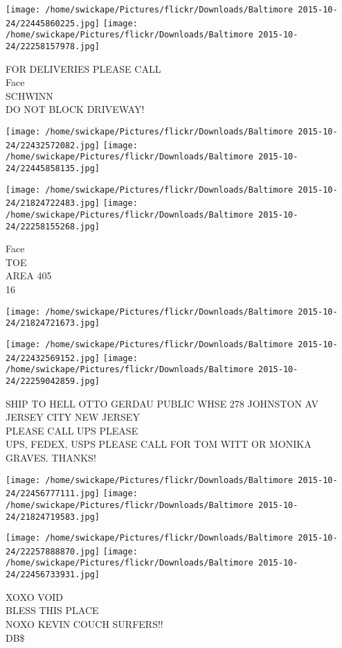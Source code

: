 \documentclass[10pt,letterpaper]{article}
\begin{document}
\texttt{[image: /home/swickape/Pictures/flickr/Downloads/Baltimore 2015-10-24/22445860225.jpg]}
\texttt{[image: /home/swickape/Pictures/flickr/Downloads/Baltimore 2015-10-24/22258157978.jpg]}

FOR DELIVERIES PLEASE CALL\\
Face\\
SCHWINN\\
DO NOT BLOCK DRIVEWAY!
\pagebreak

\texttt{[image: /home/swickape/Pictures/flickr/Downloads/Baltimore 2015-10-24/22432572082.jpg]}
\texttt{[image: /home/swickape/Pictures/flickr/Downloads/Baltimore 2015-10-24/22445858135.jpg]}

\texttt{[image: /home/swickape/Pictures/flickr/Downloads/Baltimore 2015-10-24/21824722483.jpg]}
\texttt{[image: /home/swickape/Pictures/flickr/Downloads/Baltimore 2015-10-24/22258155268.jpg]}

Face\\
TOE\\
AREA 405\\
16
\pagebreak

\texttt{[image: /home/swickape/Pictures/flickr/Downloads/Baltimore 2015-10-24/21824721673.jpg]}

\vspace{0.25in}
\texttt{[image: /home/swickape/Pictures/flickr/Downloads/Baltimore 2015-10-24/22432569152.jpg]}
\texttt{[image: /home/swickape/Pictures/flickr/Downloads/Baltimore 2015-10-24/22259042859.jpg]}

SHIP TO HELL OTTO GERDAU PUBLIC WHSE 278 JOHNSTON AV JERSEY CITY NEW JERSEY\\
PLEASE CALL UPS PLEASE\\
UPS, FEDEX, USPS PLEASE CALL FOR TOM WITT OR MONIKA GRAVES.  THANKS!
\pagebreak

\texttt{[image: /home/swickape/Pictures/flickr/Downloads/Baltimore 2015-10-24/22456777111.jpg]}
\texttt{[image: /home/swickape/Pictures/flickr/Downloads/Baltimore 2015-10-24/21824719583.jpg]}

\texttt{[image: /home/swickape/Pictures/flickr/Downloads/Baltimore 2015-10-24/22257888870.jpg]}
\texttt{[image: /home/swickape/Pictures/flickr/Downloads/Baltimore 2015-10-24/22456733931.jpg]}

XOXO VOID\\
BLESS THIS PLACE\\
NOXO KEVIN COUCH SURFERS!!\\
DB\$
\pagebreak
\end{document}
